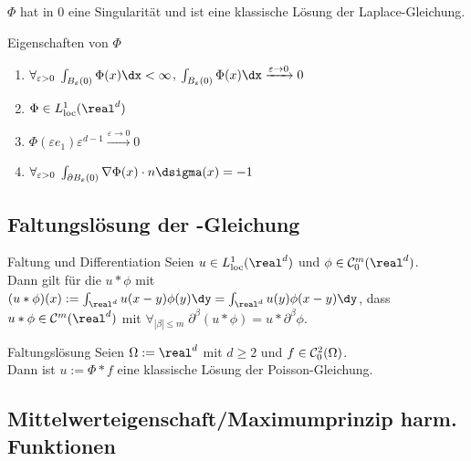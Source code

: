 \begin{Bem}
    $\Phi$ hat in $0$ eine Singularität und ist eine klassische Lösung der Laplace-Gleichung.
\end{Bem}

\linie

\begin{Lemma}{Eigenschaften von $\Phi$}
    \begin{enumerate}
        \item
        $\forall_{\varepsilon>0}\; \int_{B_\varepsilon(0)} \Phi(x)\dx < \infty$,\quad
        $\int_{B_\varepsilon(0)} \Phi(x)\dx \xrightarrow{\varepsilon \to 0} 0$

        \item
        $\Phi \in L^1_\loc(\real^d)$

        \item
        $\Phi(\varepsilon e_1) \varepsilon^{d-1} \xrightarrow{\varepsilon \to 0} 0$

        \item
        $\forall_{\varepsilon>0}\;
        \int_{\partial B_\varepsilon(0)} \nabla\Phi(x) \cdot n\dsigma(x) = -1$
    \end{enumerate}
\end{Lemma}

\subsection{%
    Faltungslösung der -Gleichung%
}

\begin{Satz}{Faltung und Dif{}ferentiation}
    Seien $u \in L^1_\loc(\real^d)$ und $\phi \in \C^m_0(\real^d)$.\\
    Dann gilt für die  $u \ast \phi$ mit
    $(u \ast \phi)(x) := \int_{\real^d} u(x-y)\phi(y) \dy
    = \int_{\real^d} u(y)\phi(x-y) \dy$, dass
    $u \ast \phi \in \C^m(\real^d)$ mit
    $\forall_{|\beta| \le m}\; \partial^\beta (u \ast \phi) = u \ast \partial^\beta \phi$.
\end{Satz}

\begin{Satz}{Faltungslösung}
    Seien $\Omega := \real^d$ mit $d \ge 2$ und $f \in \mathcal{C}^2_0(\Omega)$.\\
    Dann ist $u := \Phi \ast f$ eine klassische Lösung der Poisson-Gleichung.
\end{Satz}

\pagebreak

\subsection{%
    Mittelwerteigenschaft/Maximumprinzip harm. Funktionen%
}

